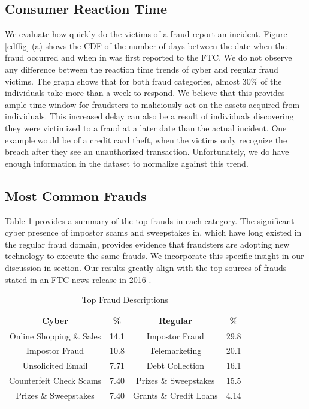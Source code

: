 \documentclass[conference]{IEEEtran}
\begin{document}
\subsection{Consumer Reaction Time}\label{fraudsters}

We evaluate how quickly do the victims of a fraud report an incident. Figure \ref{cdffig} (a) shows the CDF of the number of days between the date when the fraud occurred and when in was first reported to the FTC. We do not observe any difference between the reaction time trends of cyber and regular fraud victims. The graph shows that for both fraud categories, almost 30\% of the individuals take more than a week to respond. We believe that this provides ample time window for fraudsters to maliciously act on the assets acquired from individuals. This increased delay can also be a result of individuals discovering they were victimized to a fraud at a later date than the actual incident. One example would be of a credit card theft, when the victims only recognize the breach after they see an unauthorized transaction. Unfortunately, we do have enough information in the dataset to normalize against this trend.

\subsection{Most Common Frauds}\label{fraudsters}

Table \ref{topfrauds} provides a summary of the top frauds in each category. The significant cyber presence of impostor scams and sweepstakes in, which have long existed in the regular fraud domain, provides evidence that fraudsters are adopting new technology to execute the same frauds. We incorporate this specific insight in our discussion in section. Our results greatly align with the top sources of frauds stated in an FTC news release in 2016 \cite{ftcpress2016}. 

\begin{table}[h]
\centering
\begin{tabular}{c|c||c|c}
\hline
\bfseries Cyber & \bfseries \% & \bfseries Regular & \bfseries \% \\
\hline
\hline
Online Shopping \& Sales & 14.1 & Impostor Fraud & 29.8\\
\hline
Impostor Fraud & 10.8 & Telemarketing & 20.1\\
\hline
Unsolicited Email & 7.71 & Debt Collection & 16.1\\
\hline
Counterfeit Check Scams	 & 7.40 & Prizes \& Sweepstakes & 15.5 \\
\hline
Prizes \& Sweepstakes & 7.40 & Grants \& Credit Loans & 4.14\\
\hline
\hline
\end{tabular}
\vspace{8pt}
\caption{Top Fraud Descriptions}\label{topfrauds}
\vspace{-15pt}
\end{table}
\end{document}
